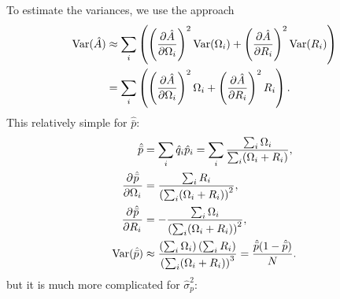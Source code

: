 \documentclass[12pt]{article}
\newcommand{\pdiff}[3][\rule{0mm}{0mm}]{\frac{\partial^{#1} #2}{\partial {#3}^{#1}}}
\newcommand{\pdiffc}[3][\rule{0mm}{0mm}]{\left (\frac{\partial #2}{\partial {#3}}\right )_{\!\!#1}}
\DeclareMathOperator{\var}{Var}
\newcommand{\prn}[1]{\left ( #1 \right )}
\begin{document}
To estimate the variances, we use the approach
%
\begin{equation}\label{eq:estvarest}
\begin{aligned}
  \var(\hat{A}) &\approx \sum_i\prn{ \pdiffc{\hat{A}}{\Omega_i}^2 \var(\Omega_i) + \pdiffc{\hat{A}}{R_i}^2 \var(R_i) }
  \\&= \sum_i\prn{ \pdiffc{\hat{A}}{\Omega_i}^2 \Omega_i + \pdiffc{\hat{A}}{R_i}^2 R_i }.
\end{aligned}
\end{equation}
%
This relatively simple for $\hat{\bar{p}}$:
%
\begin{equation}\label{eq:varpbar}
  \begin{aligned}
    \hat{\bar{p}} &= \sum_i \hat{q}_i \hat{p}_i = \sum_i \frac{\sum_i\Omega_i}{\sum_i(\Omega_i+R_i)}, \\
    \pdiff{\hat{\bar{p}}}{\Omega_i}  &= \frac{\sum_iR_i}{\prn{\sum_i(\Omega_i+R_i)}^2},\\
    \pdiff{\hat{\bar{p}}}{R_i}  &= -\frac{\sum_i\Omega_i}{\prn{\sum_i(\Omega_i+R_i)}^2},\\
    \var(\hat{\bar{p}}) &\approx \frac{\prn{\sum_i\Omega_i}\prn{\sum_iR_i}}{\prn{\sum_i(\Omega_i+R_i)}^3} = \frac{\hat{\bar{p}}(1-\hat{\bar{p}})}{N}.
  \end{aligned}
\end{equation}
%
but it is much more complicated for $\hat{\sigma}_p^2$:
%
\end{document}
